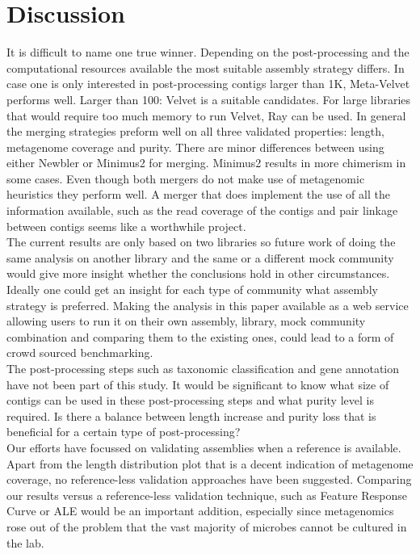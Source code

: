 \documentclass[a4paper,12pt]{report}
\begin{document}

\chapter{Discussion}
It is difficult to name one true winner. Depending on the post-processing and
the computational resources available the most suitable assembly strategy
differs. In case one is only interested in post-processing contigs larger than
1K, Meta-Velvet performs well. Larger than 100: Velvet is a suitable
candidates. For large libraries that would require too much memory to run
Velvet, Ray can be used. In general the merging strategies preform well on all
three validated properties: length, metagenome coverage and purity. There are
minor differences between using either Newbler or Minimus2 for merging.
Minimus2 results in more chimerism in some cases. Even though both mergers do not make
use of metagenomic heuristics they perform well. A merger that does implement
the use of all the information available, such as the read coverage of the
contigs and pair linkage between contigs seems like a worthwhile project.\\


The current results are only based on two libraries so future work of doing the
same analysis on another library and the same or a different mock community
would give more insight whether the conclusions hold in other circumstances.
Ideally one could get an insight for each type of community what assembly
strategy is preferred. Making the analysis in this paper available as a web
service allowing users to run it on their own assembly, library, mock community
combination and comparing them to the existing ones, could lead to a form of
crowd sourced benchmarking.\\


The post-processing steps such as taxonomic classification and gene annotation
have not been part of this study. It would be significant to know what size of
contigs can be used in these post-processing steps and what purity level is
required. Is there a balance between length increase and purity loss that is
beneficial for a certain type of post-processing?\\


Our efforts have focussed on validating assemblies when a reference is
available. Apart from the length distribution plot that is a decent indication
of metagenome coverage, no reference-less validation approaches have been
suggested. Comparing our results versus a reference-less validation technique,
such as Feature Response Curve \cite{Vezzi22319599} or ALE \cite{Clark23303509} would be an
important addition, especially since metagenomics rose out of the problem that
the vast majority of microbes cannot be cultured in the lab.
\end{document}

